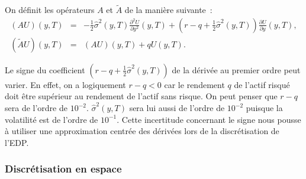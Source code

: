 On d\'efinit les op\'erateurs $A$ et $\tilde{A}$ de la 
mani\`ere suivante~:
\begin{eqnarray*}
(AU)(y,T) &=& -\frac{1}{2}\hat{\sigma}^2(y,T) 
\frac{\partial^2 U}{\partial y^2}(y,T) + 
(r-q+\frac{1}{2}\hat{\sigma}^2(y,T)) 
\frac{\partial U}{\partial y}(y,T),\\
(\tilde{A}U)(y,T) &=& (AU)(y,T) + qU(y,T).
\end{eqnarray*}

\begin{Rem}
Le signe du coefficient $(r-q+\frac{1}{2}\hat{\sigma}^2(y,T))$ de 
la d\'eriv\'ee au premier ordre peut varier. En effet, on a 
logiquement $r-q<0$ car le rendement $q$ de l'actif risqu\'e doit 
\^etre sup\'erieur au rendement de l'actif sans risque. On peut 
penser que $r-q$ sera de l'ordre de $10^{-2}$. $\hat{\sigma}^2(y,T)$ 
sera lui aussi de l'ordre de $10^{-2}$ puisque la volatilit\'e est 
de l'ordre de $10^{-1}$. Cette incertitude concernant le signe nous 
pousse \`a utiliser une approximation centr\'ee des d\'eriv\'ees 
lors de la discr\'etisation de l'EDP.
\end{Rem}

\subsubsection{Discr\'etisation en espace}

